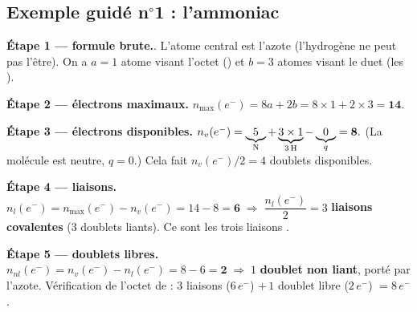 \documentclass[11pt,a4paper]{article}
\newcommand{\nmax}{n_{\max}(e^{-})}
\newcommand{\nv}{n_{v}(e^{-})}
\newcommand{\nl}{n_{l}(e^{-})}
\newcommand{\nnl}{n_{nl}(e^{-})}
\begin{document}
\subsection{Exemple guidé n\texorpdfstring{$^{\circ}$}{o}1 : l'ammoniac }

\begin{exemple}
\textbf{Étape 1 — formule brute.}\quad {}. L'atome central est l'azote  (l'hydrogène
ne peut pas l'être). On a $a=1$ atome visant l'octet () et $b=3$ atomes visant le duet
(les ).

\smallskip
\textbf{Étape 2 — électrons maximaux.}\quad
$\nmax = 8a + 2b = 8\times 1 + 2\times 3 = \mathbf{14}.$

\smallskip
\textbf{Étape 3 — électrons disponibles.}\quad
$\nv = \underbrace{5}_{\ce{N}} + \underbrace{3\times 1}_{3\,\ce{H}} - \underbrace{0}_{q} = \mathbf{8}.$
(La molécule est neutre, $q=0$.) Cela fait $\nv/2 = 4$ doublets disponibles.

\smallskip
\textbf{Étape 4 — liaisons.}\quad
$\nl = \nmax - \nv = 14 - 8 = \mathbf{6}\;\Rightarrow\;\dfrac{\nl}{2} = 3$ \textbf{liaisons
covalentes} (3 doublets liants). Ce sont les trois liaisons .

\smallskip
\textbf{Étape 5 — doublets libres.}\quad
$\nnl = \nv - \nl = 8 - 6 = \mathbf{2}\;\Rightarrow\;1$ \textbf{doublet non liant}, porté par
l'azote. Vérification de l'octet de  : $3$ liaisons ($6\,e^-$) $+\,1$ doublet libre
($2\,e^-$) $= 8\,e^-$. \checkmark
\end{exemple}
\end{document}
